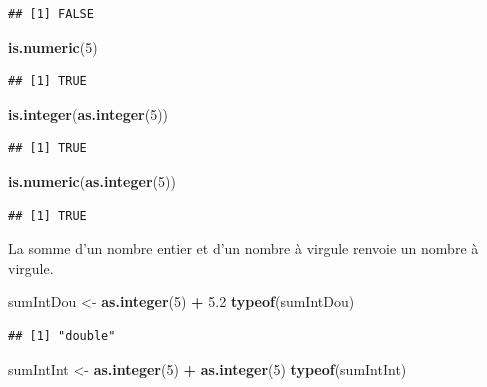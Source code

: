 \documentclass[]{book}
\newenvironment{Shaded}{\begin{snugshade}}{\end{snugshade}}
\newcommand{\DecValTok}[1]{\textcolor[rgb]{0.00,0.00,0.81}{#1}}
\newcommand{\FloatTok}[1]{\textcolor[rgb]{0.00,0.00,0.81}{#1}}
\newcommand{\KeywordTok}[1]{\textcolor[rgb]{0.13,0.29,0.53}{\textbf{#1}}}
\newcommand{\NormalTok}[1]{#1}
\newcommand{\OperatorTok}[1]{\textcolor[rgb]{0.81,0.36,0.00}{\textbf{#1}}}
\newcommand{\StringTok}[1]{\textcolor[rgb]{0.31,0.60,0.02}{#1}}
\begin{document}
\begin{verbatim}
## [1] FALSE
\end{verbatim}

\begin{Shaded}
\begin{Highlighting}[]
\KeywordTok{is.numeric}\NormalTok{(}\DecValTok{5}\NormalTok{)}
\end{Highlighting}
\end{Shaded}

\begin{verbatim}
## [1] TRUE
\end{verbatim}

\begin{Shaded}
\begin{Highlighting}[]
\KeywordTok{is.integer}\NormalTok{(}\KeywordTok{as.integer}\NormalTok{(}\DecValTok{5}\NormalTok{))}
\end{Highlighting}
\end{Shaded}

\begin{verbatim}
## [1] TRUE
\end{verbatim}

\begin{Shaded}
\begin{Highlighting}[]
\KeywordTok{is.numeric}\NormalTok{(}\KeywordTok{as.integer}\NormalTok{(}\DecValTok{5}\NormalTok{))}
\end{Highlighting}
\end{Shaded}

\begin{verbatim}
## [1] TRUE
\end{verbatim}

La somme d'un nombre entier et d'un nombre à virgule renvoie un nombre à virgule.

\begin{Shaded}
\begin{Highlighting}[]
\NormalTok{sumIntDou <-}\StringTok{ }\KeywordTok{as.integer}\NormalTok{(}\DecValTok{5}\NormalTok{) }\OperatorTok{+}\StringTok{ }\FloatTok{5.2}
\KeywordTok{typeof}\NormalTok{(sumIntDou)}
\end{Highlighting}
\end{Shaded}

\begin{verbatim}
## [1] "double"
\end{verbatim}

\begin{Shaded}
\begin{Highlighting}[]
\NormalTok{sumIntInt <-}\StringTok{ }\KeywordTok{as.integer}\NormalTok{(}\DecValTok{5}\NormalTok{) }\OperatorTok{+}\StringTok{ }\KeywordTok{as.integer}\NormalTok{(}\DecValTok{5}\NormalTok{)}
\KeywordTok{typeof}\NormalTok{(sumIntInt)}
\end{Highlighting}
\end{Shaded}
\end{document}
